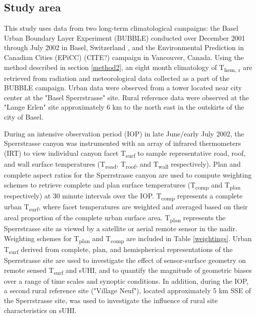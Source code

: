 \begin{bibunit}
\subsection{Study area}

This study uses data from two long-term climatological campaigns: the Basel Urban Boundary Layer Experiment (BUBBLE) conducted over December 2001 through July 2002 in Basel, Switzerland \citep{Rotach2005}, and the Environmental Prediction in Canadian Cities (EPiCC) (CITE?) campaign in Vancouver, Canada. Using the method described in section \ref{method2}, an eight month climatology of T\textsubscript{hem, r} are retrieved from radiation and meteorological data collected as a part of the BUBBLE campaign. Urban data were observed from a tower located near city center at the "Basel Sperrstrasse" site. Rural reference data were observed at the "Lange Erlen" site approximately 6 \si{\kilo\meter} to the north east in the outskirts of the city of Basel. 

During an intensive observation period (IOP) in late June/early July 2002, the Sperrstrasse canyon was instrumented with an array of infrared thermometers (IRT) to view individual canyon facet T\textsubscript{surf} to sample representative road, roof, and wall surface temperatures (T\textsubscript{road}, T\textsubscript{roof}, and T\textsubscript{wall} respectively). Plan and complete aspect ratios for the Sperrstrasse canyon are used to compute weighting schemes to retrieve complete and plan surface temperatures (T\textsubscript{comp} and T\textsubscript{plan} respectively) at 30 minute intervals over the IOP. T\textsubscript{comp} represents a complete urban T\textsubscript{surf}, where facet temperatures are weighted and averaged based on their areal proportion of the complete urban surface area. T\textsubscript{plan} represents the Sperrstrasse site as viewed by a satellite or aerial remote sensor in the nadir. Weighting schemes for T\textsubscript{plan} and T\textsubscript{comp} are included in Table \ref{weightings}. Urban T\textsubscript{surf} derived from complete, plan, and hemispherical representations of the Sperrstrasse site are used to investigate the effect of sensor-surface geometry on remote sensed T\textsubscript{surf} and sUHI, and to quantify the magnitude of geometric biases over a range of time scales and synoptic conditions. In addition, during the IOP, a second rural reference site ("Village Neuf"), located approximately 5 \si{\kilo\meter} SSE of the Sperrstrasse site, was used to investigate the influence of rural site characteristics on sUHI. 


\end{bibunit}
